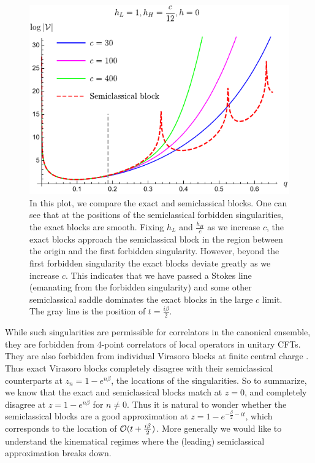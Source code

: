 \begin{figure}[t]
\centering{}\includegraphics[]{virasoro_chapter/forbiddensingularity}
\caption{In this plot, we compare the exact and semiclassical blocks. One can see that at the positions of the semiclassical forbidden singularities, the exact blocks are smooth. Fixing $h_L$ and $\frac{h_H}{c}$ as we increase $c$, the exact blocks approach the semiclassical block in the region between the origin and the first forbidden singularity.  However, beyond the first forbidden singularity the exact blocks deviate greatly as we increase $c$.  This indicates that we have passed a Stokes line (emanating from the forbidden singularity) and some other semiclassical saddle dominates the exact blocks in the large $c$ limit.  The gray line is the position of $t =  \frac{i \beta}{2}$.}
\label{fig:forbidden}
\end{figure}

While such singularities are permissible for correlators in the canonical ensemble, they are forbidden \cite{Maldacena:2015iua, Fitzpatrick:2016ive} from 4-point correlators of local operators in unitary CFTs.  They are also forbidden from individual Virasoro blocks at finite central charge \cite{Fitzpatrick:2016ive, Fitzpatrick:2016mjq}.  Thus exact Virasoro blocks completely disagree with their semiclassical counterparts at $z_n = 1 - e^{n \beta}$, the locations of the singularities.  So to summarize, we know that the exact and semiclassical blocks match at $z = 0$, and completely disagree at $z = 1 - e^{n \beta}$ for $n \neq 0$.  Thus it is natural to wonder whether the semiclassical blocks are a good approximation at $z = 1 - e^{-\frac{\beta}{2} -it}$, which corresponds to the location of ${\cal O}(t + \frac{i \beta}{2})$.  More generally we would like to understand the kinematical regimes where the (leading) semiclassical approximation breaks down.


